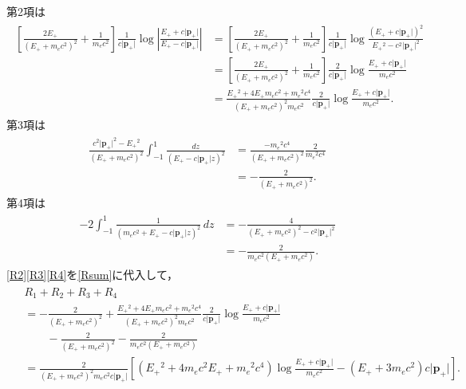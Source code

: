 第2項は
\begin{align}
  \begin{split}
    \left[\frac{2E_+}{(E_+ + m_ec^2)^2} + \frac{1}{m_ec^2}\right] \frac{1}{c\lvert\boldsymbol{p}_+\rvert} \log\left\lvert\frac{E_+ + c\lvert\boldsymbol{p}_+\rvert}{E_+ - c\lvert\boldsymbol{p}_+\rvert}\right\rvert &= \left[\frac{2E_+}{(E_+ + m_ec^2)^2} + \frac{1}{m_ec^2}\right] \frac{1}{c\lvert\boldsymbol{p}_+\rvert} \log\frac{(E_+ + c\lvert\boldsymbol{p}_+\rvert)^2}{E_+{}^2 - c^2\lvert\boldsymbol{p}_+\rvert^2} \\
    &= \left[\frac{2E_+}{(E_+ + m_ec^2)^2} + \frac{1}{m_ec^2}\right] \frac{2}{c\lvert\boldsymbol{p}_+\rvert} \log \frac{E_+ + c\lvert\boldsymbol{p}_+\rvert}{m_ec^2} \\
    &= \frac{E_+{}^2 + 4E_+m_ec^2 + m_e{}^2c^4}{(E_+ + m_ec^2)^2m_ec^2} \frac{2}{c\lvert\boldsymbol{p}_+\rvert} \log \frac{E_+ + c\lvert\boldsymbol{p}_+\rvert}{m_ec^2}.
  \end{split}\label{R2}
\end{align}
第3項は
\begin{align}
  \begin{split}
    \frac{c^2\lvert\boldsymbol{p}_+\rvert^2 - E_+{}^2}{(E_+ + m_ec^2)^2} \int_{-1}^1 \frac{dz}{(E_+ - c\lvert\boldsymbol{p}_+\rvert z)^2} &= \frac{-m_e{}^2c^4}{(E_+ + m_ec^2)^2}\frac{2}{m_e{}^2c^4} \\
    &= -\frac{2}{(E_+ + m_ec^2)^2}.
  \end{split}\label{R3}
\end{align}
第4項は
\begin{align}
  \begin{split}
    - 2\int_{-1}^1 \frac{1}{(m_ec^2 + E_+ - c\lvert\boldsymbol{p}_+\rvert z)^2}\,dz &= -\frac{4}{(E_++m_ec^2)^2 - c^2\lvert\boldsymbol{p}_+\rvert^2} \\
    &= -\frac{2}{m_ec^2(E_+ + m_ec^2)}.
  \end{split}\label{R4}
\end{align}
\eqref{R2}\eqref{R3}\eqref{R4}を\eqref{Rsum}に代入して，
\begin{align}
  \begin{split}
    & R_1 + R_2 + R_3 + R_4 \\
    &= -\frac{2}{(E_+ + m_ec^2)^2} + \frac{E_+{}^2 + 4E_+m_ec^2 + m_e{}^2c^4}{(E_+ + m_ec^2)^2m_ec^2} \frac{2}{c\lvert\boldsymbol{p}_+\rvert} \log \frac{E_+ + c\lvert\boldsymbol{p}_+\rvert}{m_ec^2} \\
    &\qquad - \frac{2}{(E_+ + m_ec^2)^2} - \frac{2}{m_ec^2(E_+ + m_ec^2)} \\
    &= \frac{2}{(E_+ + m_ec^2)^2m_ec^2c\lvert\boldsymbol{p}_+\rvert} \left[(E_+{}^2 + 4m_ec^2E_+ + m_e{}^2c^4)\log \frac{E_+ + c\lvert\boldsymbol{p}_+\rvert}{m_ec^2} - (E_+ + 3m_ec^2) c\lvert\boldsymbol{p}_+\rvert\right].
  \end{split}
\end{align}
